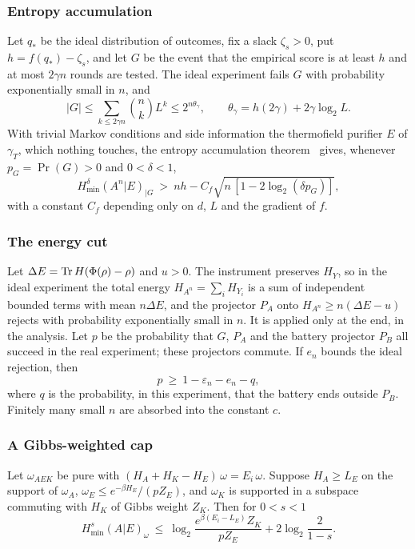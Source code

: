 \subsubsection{Entropy accumulation}

Let $q_*$ be the ideal distribution of outcomes, fix a slack $\zeta_s>0$, put $h=f(q_*)-\zeta_s$, and let $G$ be the event that the empirical score is at least $h$ and at most $2\gamma n$ rounds are tested. The ideal experiment fails $G$ with probability exponentially small in $n$, and
\[
|G|\le\sum_{k\le2\gamma n}\binom nk L^k\le2^{n\theta_\gamma},\qquad\theta_\gamma=h(2\gamma)+2\gamma\log_2L.
\]
With trivial Markov conditions and side information the thermofield purifier $E$ of $\gamma_T$, which nothing touches, the entropy accumulation theorem~\cite{DFR20} gives, whenever $p_G=\Pr(G)>0$ and $0<\delta<1$,
\begin{equation}\label{sw:eq:eat}
H_{\min}^\delta(A^n|E)_{|G}\ >\ nh-C_f\sqrt{n\,[1-2\log_2(\delta p_G)]},
\end{equation}
with a constant $C_f$ depending only on $d$, $L$ and the gradient of $f$.

\subsubsection{The energy cut}

Let $\Delta E=\operatorname{Tr} H(\Phi(\rho)-\rho)$ and $u>0$. The instrument preserves $H_Y$, so in the ideal experiment the total energy $H_{A^n}=\sum_iH_{Y_i}$ is a sum of independent bounded terms with mean $n\Delta E$, and the projector $P_A$ onto $H_{A^n}\ge n(\Delta E-u)$ rejects with probability exponentially small in $n$. It is applied only at the end, in the analysis. Let $p$ be the probability that $G$, $P_A$ and the battery projector $P_B$ all succeed in the real experiment; these projectors commute. If $e_n$ bounds the ideal rejection, then
\begin{equation}\label{sw:eq:p}
p\ \ge\ 1-\varepsilon_n-e_n-q,
\end{equation}
where $q$ is the probability, in this experiment, that the battery ends outside $P_B$. Finitely many small $n$ are absorbed into the constant $c$.

\subsubsection{A Gibbs-weighted cap}

\begin{lemma}\label{sw:lem:cap}
Let $\omega_{AEK}$ be pure with $(H_A+H_K-H_E)\,\omega=E_i\,\omega$. Suppose $H_A\ge L_E$ on the support of $\omega_A$, $\omega_E\le e^{-\beta H_E}/(pZ_E)$, and $\omega_K$ is supported in a subspace commuting with $H_K$ of Gibbs weight $Z_K$. Then for $0<s<1$
\[
H^s_{\min}(A|E)_\omega\ \le\ \log_2\frac{e^{\beta(E_i-L_E)}Z_K}{pZ_E}+2\log_2\frac2{1-s}.
\]
\end{lemma}

